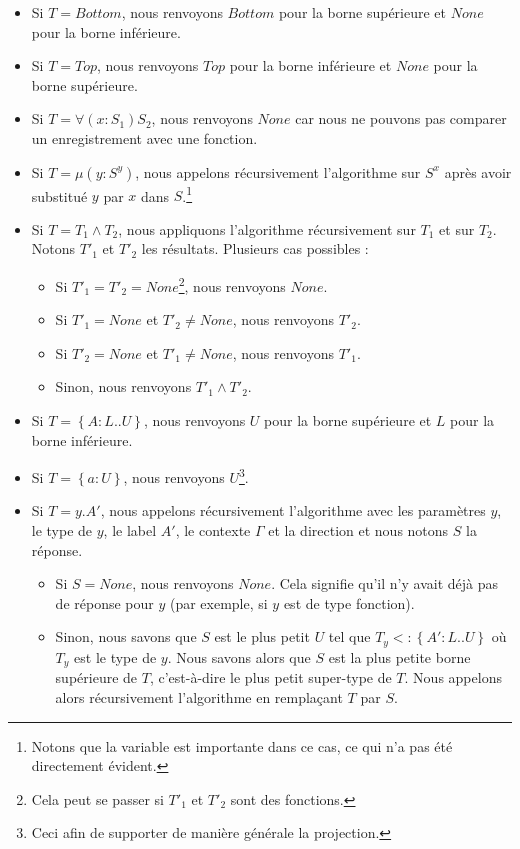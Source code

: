 \begin{itemize}
\item Si $T = Bottom$, nous renvoyons $Bottom$ pour la borne supérieure et
  $None$ pour la borne inférieure.
\item Si $T = Top$, nous renvoyons $Top$ pour la borne inférieure et
  $None$ pour la borne supérieure.
\item Si $T = \forall(x : S_{1}) S_{2}$, nous renvoyons $None$ car nous
  ne pouvons pas comparer un enregistrement avec une fonction.
\item Si $T = \mu(y : S^{y})$, nous appelons récursivement l'algorithme sur
  $S^{x}$ après avoir substitué $y$ par $x$ dans $S$.\footnote{Notons que la
    variable est importante dans ce cas, ce qui n'a pas été directement
    évident.}
\item Si $T = T_{1} \wedge T_{2}$, nous
  appliquons l'algorithme récursivement sur $T_{1}$ et sur $T_{2}$. Notons
  $T'_{1}$ et $T'_{2}$ les résultats. Plusieurs cas possibles :
  \begin{itemize}
  \item Si $T'_{1} = T'_{2} = None$\footnote{Cela peut se
    passer si $T'_{1}$ et $T'_{2}$ sont des fonctions.}, nous renvoyons $None$.
  \item Si $T'_{1} = None$ et $T'_{2} \neq None$, nous renvoyons $T'_{2}$.
  \item Si $T'_{2} = None$ et $T'_{1} \neq None$, nous renvoyons $T'_{1}$.
  \item Sinon, nous renvoyons $T'_{1} \wedge T'_{2}$.
  \end{itemize}
\item Si $T = \left\{ A : L .. U \right\}$, nous renvoyons $U$ pour la borne
  supérieure et $L$ pour la borne inférieure.
\item Si $T = \left\{ a : U \right\}$, nous renvoyons $U$\footnote{Ceci afin de
    supporter de manière générale la projection.}.
\item Si $T = y.A'$, nous appelons récursivement l'algorithme avec les paramètres
  $y$, le type de $y$, le label $A'$, le contexte $\Gamma$ et la direction et
  nous notons $S$ la réponse.
  \begin{itemize}
  \item Si $S = None$, nous renvoyons $None$. Cela signifie qu'il n'y avait déjà
  pas de réponse pour $y$ (par exemple, si $y$ est de type fonction).
  \item Sinon, nous savons que $S$ est le plus petit $U$ tel que $T_{y} <:
    \left\{ A' 
    : L .. U \right\}$ où $T_{y}$ est le type de $y$. Nous savons alors que $S$
  est la plus petite borne supérieure de $T$, c'est-à-dire le plus petit super-type de $T$. Nous
  appelons alors récursivement l'algorithme en remplaçant $T$ par $S$.
  \end{itemize}
\end{itemize}

